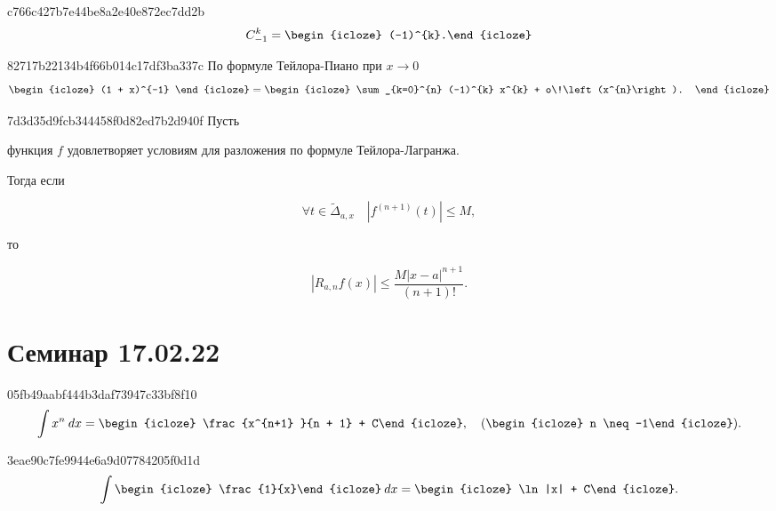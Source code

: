 \begin{note}{c766c427b7e44be8a2e40e872ec7dd2b}
    \[
        C_{-1}^{k} = \begin{icloze}{1}(-1)^{k}.\end{icloze}
    \]
\end{note}

\begin{note}{82717b22134b4f66b014c17df3ba337c}
    По формуле Тейлора-Пиано при \( x \to 0 \)
    \[
        \begin{icloze}{2}(1 + x)^{-1} \end{icloze} = \begin{icloze}{1}\sum_{k=0}^{n} (-1)^{k} x^{k} + o\!\left(x^{n}\right). \end{icloze}
    \]
\end{note}

\begin{note}{7d3d35d9fcb344458f0d82ed7b2d940f}
    Пусть \begin{icloze}{3}функция \( f \) удовлетворяет условиям для разложения по формуле Тейлора-Лагранжа.\end{icloze}
    Тогда если
    \begin{icloze}{2}
        \[
            \forall t \in \widetilde \Delta _{a, x} \quad |f^{(n + 1)} (t)| \leqslant M,
        \]
    \end{icloze}
    то
    \begin{icloze}{1}
        \[
            |R_{a, n} f(x)| \leqslant \frac{M|x - a|^{n + 1} }{(n + 1)! }.
        \]
    \end{icloze}
\end{note}

\section{Семинар 17.02.22}
\begin{note}{05fb49aabf444b3daf73947c33bf8f10}
    \[
        \int x^{n} \: dx = \begin{icloze}{1}\frac{x^{n+1} }{n + 1} + C\end{icloze}, \quad (\begin{icloze}{2}n \neq -1\end{icloze}).
    \]
\end{note}

\begin{note}{3eae90c7fe9944e6a9d07784205f0d1d}
    \[
        \int \begin{icloze}{2}\frac{1}{x}\end{icloze} \: dx = \begin{icloze}{1}\ln |x| + C\end{icloze}.
    \]
\end{note}


